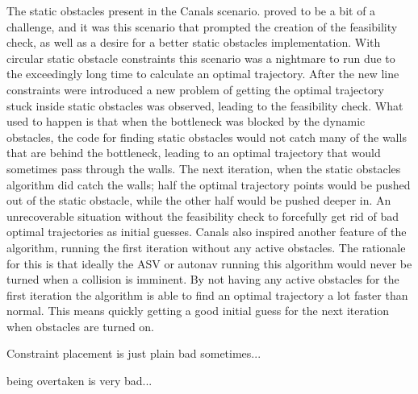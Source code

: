 The static obstacles present in the Canals scenario. proved to be a bit of a challenge, and it was this scenario that prompted the creation of the feasibility check, as well as
a desire for a better static obstacles implementation. With circular static obstacle constraints this scenario was a nightmare to run due to the exceedingly long
time to calculate an optimal trajectory. After the new line constraints were introduced a new problem of getting the optimal trajectory
stuck inside static obstacles was observed, leading to the feasibility check. What used to happen is that when the bottleneck
was blocked by the dynamic obstacles, the code for finding static obstacles would not catch many of the walls that are behind the bottleneck, leading to
an optimal trajectory that would sometimes pass through the walls. The next iteration, when the static obstacles algorithm did catch the walls; half
the optimal trajectory points would be pushed out of the static obstacle, while the other half would be pushed deeper in. An unrecoverable situation without
the feasibility check to forcefully get rid of bad optimal trajectories as initial guesses.\newline
Canals also inspired another feature of the algorithm, running the first iteration without any active obstacles. The rationale for this is that
ideally the \gls{ASV} or autonav running this algorithm would never be turned when a collision is imminent. By not having any active obstacles for the first
iteration the algorithm is able to find an optimal trajectory a lot faster than normal. This means quickly getting a good initial guess for the next
iteration when obstacles are turned on.

Constraint placement is just plain bad sometimes...

being overtaken is very bad...

